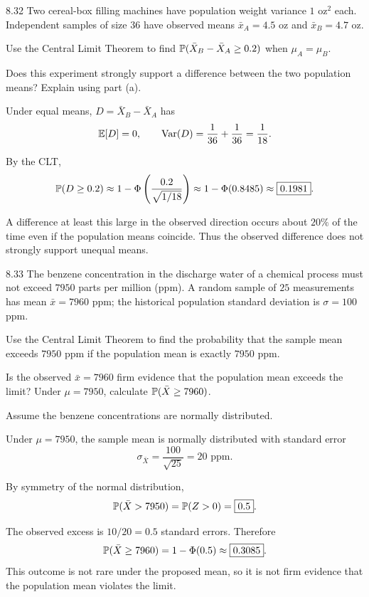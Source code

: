 \documentclass[11pt,oneside]{article}
\begin{document}
\begin{exercise}{8.32}
Two cereal-box filling machines have population weight variance $1\text{ oz}^2$ each. Independent samples of size $36$ have observed means $\bar x_A=4.5$ oz and $\bar x_B=4.7$ oz.
\begin{exercisesubparts}
\item Use the Central Limit Theorem to find $\mathbb{P}(\bar X_B-\bar X_A\ge0.2)$ when $\mu_A=\mu_B$.
\item Does this experiment strongly support a difference between the two population means? Explain using part (a).
\end{exercisesubparts}
\end{exercise}
\begin{solution}
Under equal means, $D=\bar X_B-\bar X_A$ has
\[
\mathbb{E}[D]=0, \qquad
\operatorname{Var}(D)=\frac{1}{36}+\frac{1}{36}=\frac1{18}.
\]
\begin{exercisesubparts}
\item By the CLT,
\[
\mathbb{P}(D\ge0.2)
\approx1-\Phi\left(\frac{0.2}{\sqrt{1/18}}\right)
\approx1-\Phi(0.8485)\approx\boxed{0.1981}.
\]
\item A difference at least this large in the observed direction occurs about $20\%$ of the time even if the population means coincide. Thus the observed difference does not strongly support unequal means.
\end{exercisesubparts}
\end{solution}

\begin{exercise}{8.33}
The benzene concentration in the discharge water of a chemical process must not exceed $7950$ parts per million (ppm). A random sample of $25$ measurements has mean $\bar x=7960$ ppm; the historical population standard deviation is $\sigma=100$ ppm.
\begin{exercisesubparts}
\item Use the Central Limit Theorem to find the probability that the sample mean exceeds $7950$ ppm if the population mean is exactly $7950$ ppm.
\item Is the observed $\bar x=7960$ firm evidence that the population mean exceeds the limit? Under $\mu=7950$, calculate $\mathbb{P}(\bar X\ge7960)$.
\end{exercisesubparts}
Assume the benzene concentrations are normally distributed.
\end{exercise}
\begin{solution}
Under $\mu=7950$, the sample mean is normally distributed with standard error
\[
\sigma_{\bar X}=\frac{100}{\sqrt{25}}=20\text{ ppm}.
\]
\begin{exercisesubparts}
\item By symmetry of the normal distribution,
\[
\mathbb{P}(\bar X>7950)=\mathbb{P}(Z>0)=\boxed{0.5}.
\]
\item The observed excess is $10/20=0.5$ standard errors. Therefore
\[
\mathbb{P}(\bar X\ge7960)
=1-\Phi(0.5)\approx\boxed{0.3085}.
\]
This outcome is not rare under the proposed mean, so it is not firm evidence that the population mean violates the limit.
\end{exercisesubparts}
\end{solution}
\end{document}
